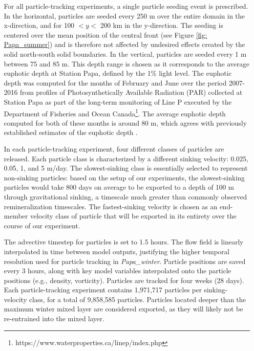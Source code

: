 \documentclass[article,linenumbers]{agujournal2018}
\begin{document}
	For all particle-tracking experiments, a single particle seeding event is prescribed. In the horizontal, particles are seeded every 250 m over the entire domain in the x-direction, and for 100 $<y<$ 200 km in the y-direction. The seeding is centered over the mean position of the central front (see Figure \ref{fig: Papa_summer}) and is therefore not affected by undesired effects created by the solid north-south solid boundaries. In the vertical, particles are seeded every 1 m between 75 and 85 m. This depth range is chosen as it corresponds to the average euphotic depth at Station Papa, defined by the 1\% light level. The euphotic depth was computed for the months of February and June over the period 2007-2016 from profiles of Photosynthetically Available Radiation (PAR) collected at Station Papa as part of the long-term monitoring of Line P executed by the Department of Fisheries and Ocean Canada\footnote{https://www.waterproperties.ca/linep/index.php}. The average euphotic depth computed for both of these months is around 80 m, which agrees with previously established estimates of the euphotic depth \citep{Sherry_1999,Harrison_2004}.
	
	In each particle-tracking experiment, four different classes of particles are released. Each particle class is characterized by a different sinking velocity: 0.025, 0.05, 1, and 5 m/day. The slowest-sinking class is essentially selected to represent non-sinking particles: based on the setup of our experiments, the slowest-sinking particles would take 800 days on average to be exported to a depth of 100 m through gravitational sinking, a timescale much greater than commonly observed remineralization timescales. The fastest-sinking velocity is chosen as an end-member velocity class of particle that will be exported in its entirety over the course of our experiment. %
	
	The advective timestep for particles is set to 1.5 hours. The flow field is linearly interpolated in time between model outputs, justifying the higher temporal resolution used for particle tracking in \textit{Papa\_winter}. Particle positions are saved every 3 hours, along with key model variables interpolated onto the particle positions (e.g., density, vorticity). Particles are tracked for four weeks (28 days). Each particle-tracking experiment contains 1,971,717 particles per sinking-velocity class, for a total of 9,858,585 particles. Particles located deeper than the maximum winter mixed layer \citep[i.e., 100 m;][]{Pelland_2016, Plant_2016} are considered exported, as they will likely not be re-entrained into the mixed layer.
	
\end{document}
